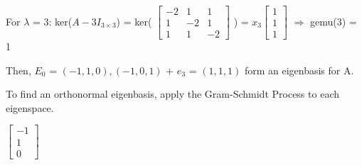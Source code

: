 \begin{tbox}
        \hspace{0.5cm}
        For $\lambda$ = 3:
        \hspace{0.45cm}
        ker($A - 3I_{3 \times 3}$) =
        ker(
        \scriptsize
        $\begin{bmatrix}
            -2 & 1 & 1 \\
            1 & -2 & 1 \\
            1 & 1 & -2
        \end{bmatrix}$
        \normalsize) =
        \scriptsize
        $x_3\begin{bmatrix}
            1 \\
            1 \\
            1
        \end{bmatrix}$
        \normalsize
        \hspace{1.2cm}
        $\Rightarrow$
        \hspace{0.5cm}
        gemu(3) = 1
        
        Then, $E_0$ = $(-1,1,0), (-1,0,1)$ + $e_3$ = $(1,1,1)$
        form an eigenbasis for A.

        To find an orthonormal eigenbasis, apply the Gram-Schmidt Process
        to each eigenspace.

        \hspace{0.5cm}
        \scriptsize
        $\begin{bmatrix}
            -1 \\
            1 \\
            0
        \end{bmatrix}$


\end{tbox}
